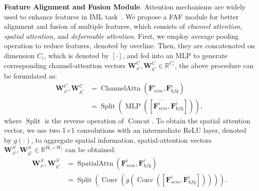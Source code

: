 \documentclass{article}
\begin{document}
\noindent\textbf{Feature Alignment and Fusion Module}. 
Attention mechanisms are widely used to enhance features in IML task~\cite{MVSS}. We propose a FAF module for better alignment and fusion of multiple features, which consists of \textit{channel attention}, \textit{spatial attention}, and \textit{deformable attention}. 
First, we employ average pooling operation to reduce features, denoted by overline. Then, they are concatenated on dimension $C_i$, which is denoted by $[\cdot]$, and fed into an MLP to generate corresponding channel-attention vectors $\mathbf W^C_{s^i}, \mathbf W^C_{h^i}\in \mathbb{R}^{C_i}$, the above procedure can be formulated as:
\begin{equation}
\label{channel_att}
\begin{split}
\mathbf W^C_{s^i},\mathbf W^C_{h^i} &= \operatorname{ChannelAttn}(\mathbf F^i_{sem}, 
\mathbf F^i_{\textit{hfq}}) \\
&= \operatorname{Split}\left(\operatorname{MLP}\left(\left[{\overline{\mathbf F^i_{sem}}}, {\overline{\mathbf F^i_{\textit{hfq}}}}\right]\right)\right),
\end{split}
\end{equation}
where $\operatorname{Split}$ is the reverse operation of $\operatorname{Concat}$. To obtain the spatial attention vector, we use two 1×1 convolutions with an intermediate ReLU layer, denoted by $g(\cdot)$, to aggregate spatial information, spatial-attention vectors $\mathbf W^S_{s^i},\mathbf W^S_{h^i}\in \mathbb{R}^{H_i\times W_i}$ can be obtained:
\begin{equation}
\label{spatial_att}
\begin{split}
\mathbf W^S_{s^i}, \mathbf W^S_{h^i} &= \operatorname{SpatialAttn}\left(\mathbf F^i_{sem}, 
\mathbf F^i_{\textit{hfq}}\right) \\
&= \operatorname{Split}\left(\operatorname{Conv}\left({g}\left(\operatorname{Conv}\left(\left[\mathbf F^i_{sem}, 
\mathbf F^i_{\textit{hfq}}\right]\right)\right)\right)\right).
\end{split}   
\end{equation}
\end{document}
